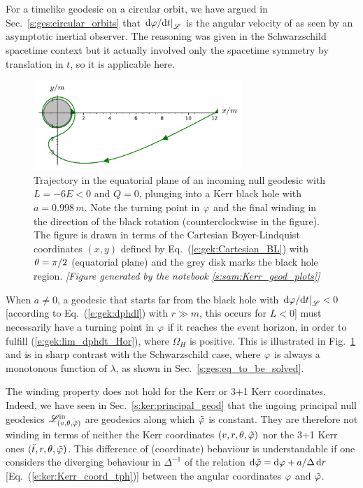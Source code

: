 \begin{remark}
For a timelike geodesic on a circular orbit, we have argued in Sec.~\ref{s:ges:circular_orbits}
that $\left. \mathrm{d}\varphi/\mathrm{d} t \right| _{\mathscr{L}}$ is the angular velocity of
as seen by an asymptotic inertial observer. The reasoning was
given in the Schwarzschild spacetime context but it actually involved only
the spacetime symmetry by translation in $t$, so it is applicable here.
\end{remark}

\begin{figure}
\centerline{\includegraphics[width=0.7\textwidth]{gek_winding_null.pdf}}
\caption[]{\label{f:gek:winding_null} \footnotesize
Trajectory in the equatorial plane of an incoming null geodesic with
$L=-6E < 0$ and $Q=0$, plunging into a Kerr black hole with $a = 0.998 \, m$.
Note the turning point in $\varphi$ and the final winding in the direction of the black
rotation (counterclockwise in the figure). The figure is drawn in terms
of the Cartesian Boyer-Lindquist coordinates $(x,y)$ defined by
Eq.~(\ref{e:gek:Cartesian_BL}) with $\theta=\pi/2$ (equatorial plane)
and the grey disk marks the black hole region.
\textsl{[Figure generated by the notebook \ref{s:sam:Kerr_geod_plots}]}
}
\end{figure}


\begin{remark}
When $a\not=0$,
a geodesic that starts far from the black hole with
$\left. \mathrm{d}\varphi/\mathrm{d} t \right| _{\mathscr{L}} < 0$ [according to Eq.~(\ref{e:gek:dphdl}) with $r\gg m$,
this occurs for $L <0$]
must necessarily have a turning point in $\varphi$
if it reaches the event horizon, in order to fulfill (\ref{e:gek:lim_dphdt_Hor}),
where $\Omega_H$ is positive. This is illustrated in Fig.~\ref{f:gek:winding_null}
and is in sharp contrast with the Schwarzschild case, where $\varphi$ is always
a monotonous function of $\lambda$, as shown in Sec.~\ref{s:ges:eq_to_be_solved}.
\end{remark}


\begin{remark}
The winding property does not hold for the Kerr or 3+1 Kerr coordinates. Indeed,
we have seen in Sec.~\ref{s:ker:principal_geod} that the
ingoing principal null geodesics $\mathscr{L}^{\rm in}_{(v,\theta,{\tilde\varphi})}$ are geodesics
along which ${\tilde\varphi}$ is constant. They are therefore not winding in terms
of neither the Kerr coordinates $(v,r,\theta,{\tilde\varphi})$ nor the 3+1 Kerr ones $({\tilde t},r,\theta,{\tilde\varphi})$.
This difference of (coordinate) behaviour is understandable if one considers
the diverging behaviour in $\Delta^{-1}$ of the
relation $\mathrm{d} {\tilde\varphi} = \mathrm{d} \varphi + a/\Delta\, \mathrm{d} r$ [Eq.~(\ref{e:ker:Kerr_coord_tph})]
between the angular coordinates $\varphi$ and ${\tilde\varphi}$.
\end{remark}

